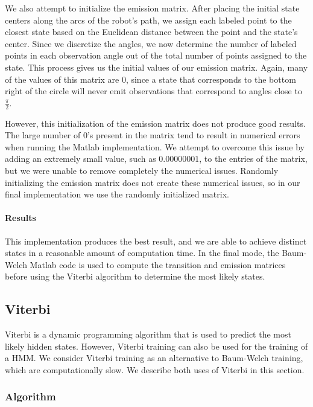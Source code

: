 \documentclass[twoside]{article}
\begin{document}
We also attempt to initialize the emission matrix.
After placing the initial state centers along the arcs of the robot's path, we assign each labeled point to the closest state based on the Euclidean distance between the point and the state's center.
Since we discretize the angles, we now determine the number of labeled points in each observation angle out of the total number of points assigned to the state.
This process gives us the initial values of our emission matrix.
Again, many of the values of this matrix are $0$, since a state that corresponds to the bottom right of the circle will never emit observations that correspond to angles close to~$\frac{\pi}{2}$.

However, this initialization of the emission matrix does not produce good results.
The large number of $0$'s present in the matrix tend to result in numerical errors when running the Matlab implementation.
We attempt to overcome this issue by adding an extremely small value, such as $0.00000001$, to the entries of the matrix, but we were unable to remove completely the numerical issues.
Randomly initializing the emission matrix does not create these numerical issues, so in our final implementation we use the randomly initialized matrix.

\paragraph{Results}

This implementation produces the best result, and we are able to achieve distinct states in a reasonable amount of computation time.
In the final mode, the Baum-Welch Matlab code is used to compute the transition and emission matrices before using the Viterbi algorithm to determine the most likely states.

\subsection{Viterbi}\label{sec:viterbi}

Viterbi is a dynamic programming algorithm that is used to predict the most likely hidden states.
However, Viterbi training can also be used for the training of a HMM.
We consider Viterbi training as an alternative to Baum-Welch training, which are computationally slow.
We describe both uses of Viterbi in this section.

\subsubsection{Algorithm}\label{sec:algorithm-viterbi}
\end{document}
